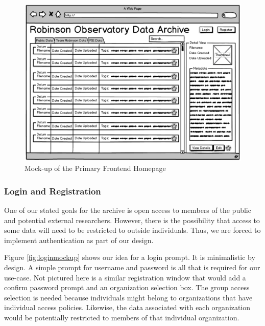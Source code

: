 \documentclass[12pt]{report}
\begin{document}
\begin{enumerate}
\begin{figure}[h]
	\centering
	\includegraphics[width=\linewidth]{frontend_mockup}
	\caption{Mock-up of the Primary Frontend Homepage}
	\label{fig:frontendmockup}
\end{figure}

\subsubsection*{Login and Registration}

One of our stated goals for the archive is open access to members of the public and potential external researchers. However, there is the possibility that access to some data will need to be restricted to outside individuals. Thus, we are forced to implement authentication as part of our design.

Figure \ref{fig:loginmockup} shows our idea for a login prompt. It is minimalistic by design. A simple prompt for username and password is all that is required for our use-case. Not pictured here is a similar registration window that would add a confirm password prompt and an organization selection box. The group access selection is needed because individuals might belong to organizations that have individual access policies. Likewise, the data associated with each organization would be potentially restricted to members of that individual organization.


\end{enumerate}
\end{document}
